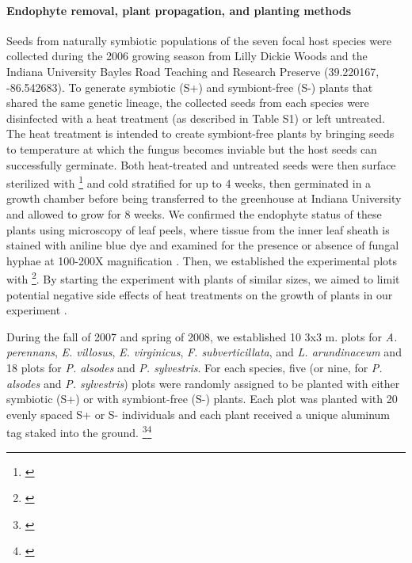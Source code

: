 \documentclass[12pt]{article}
\newcommand{\tom}[2]{{\color{red}{#1}}\footnote{\textit{\color{red}{#2}}}}
\newcommand{\josh}[2]{{\color{blue}{#1}}\footnote{\textit{\color{blue}{#2}}}}
\begin{document}
\paragraph*{Endophyte removal, plant propagation, and planting methods}
Seeds from naturally symbiotic populations of the seven focal host species were collected during the 2006 growing season from Lilly Dickie Woods and the Indiana University Bayles Road Teaching and Research Preserve (39.220167, -86.542683). 
To generate symbiotic (S+) and symbiont-free (S-) plants that shared the same genetic lineage, the collected seeds from each species were disinfected with a heat treatment (as described in Table S1) or left untreated. 
The heat treatment is intended to create symbiont-free plants by bringing seeds to temperature at which the fungus becomes inviable but the host seeds can successfully germinate.
Both heat-treated and untreated seeds were then surface sterilized with \tom{bleach}{probably a 5\% solution} and cold stratified for {\color{red}up to 4 weeks}, then germinated in a growth chamber before being transferred to the greenhouse at Indiana University and allowed to grow for {\color{red}8 weeks}. 
We confirmed the endophyte status of these plants using microscopy of leaf peels, where tissue from the inner leaf sheath is stained with aniline blue dye and examined for the presence or absence of fungal hyphae at 100-200X magnification \cite{bacon2018stains}. 
Then, we established the experimental plots with \tom{vegetatively propagated clones of similar sizes from the plants}{not sure this happened}. 
By starting the experiment with plants of similar sizes, we aimed to limit potential negative side effects of heat treatments on the growth of plants in our experiment \cite{rudgers2009benefits}.

During the fall of 2007 and spring of 2008, we established 10 3x3 m. plots for \emph{A. perennans}, \emph{E. villosus}, \emph{E. virginicus}, \emph{F. subverticillata}, and \emph{L. arundinaceum}  and 18 plots for \emph{P. alsodes} and \emph{P. sylvestris}.
For each species, five (or nine, for \emph{P. alsodes} and \emph{P. sylvestris}) plots were randomly assigned to be planted with either symbiotic (S+) or with symbiont-free (S-) plants.
Each plot was planted with 20 evenly spaced S+ or S- individuals and each plant received a unique aluminum tag staked into the ground. 
\josh{In XXXX, we placed fencing around each plot to limit herbivory and disturbance in the plots, and replaced fencing for all plots in XXXX.}{}\tom{}{I believe that all plots were fenced from the beginning, but check with Jenn.}
\end{document}
